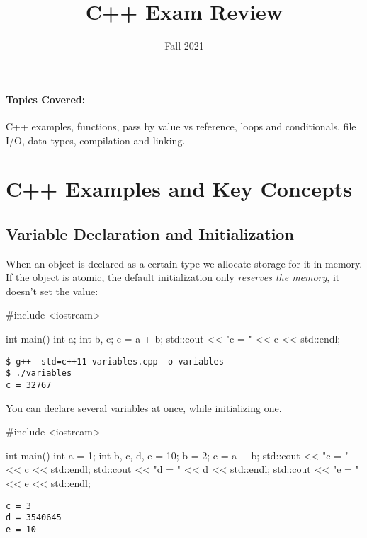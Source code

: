 \documentclass[12pt,letterpaper,twoside]{article}
\begin{document}
\title{C++ Exam Review\vspace{-5ex}}
\date{Fall 2021}
\maketitle
{\footnotesize
\paragraph{Topics Covered:} C++ examples, functions, pass by value vs reference, loops and conditionals, file I/O, data types, compilation and linking.
}
\vspace{-3ex}
\begin{spacing}{0.5} \tableofcontents \end{spacing}

\newpage

\section{C++ Examples and Key Concepts}

\subsection{Variable Declaration and Initialization}

When an object is declared as a certain type we allocate storage for it in memory.  If the object is atomic, the default initialization only \textit{reserves the memory}, it doesn't set the value:

\begin{cpp}
#include <iostream>

int main() {
  int a;
  int b, c;
  c = a + b;
  std::cout << "c = " << c << std::endl;
}
\end{cpp}
\vspace{-3ex}
{
\footnotesize
\begin{verbatim}
$ g++ -std=c++11 variables.cpp -o variables
$ ./variables
c = 32767
\end{verbatim}
}

You can declare several variables at once, while initializing one.

\begin{cpp}
#include <iostream>

int main() {
  int a = 1;
  int b, c, d, e = 10;
  b = 2;
  c = a + b;
  std::cout << "c = " << c << std::endl;
  std::cout << "d = " << d << std::endl;
  std::cout << "e = " << e << std::endl;
}
\end{cpp}
\vspace{-3ex}
{
\footnotesize
\begin{verbatim}
c = 3
d = 3540645
e = 10
\end{verbatim}
}
\end{document}
